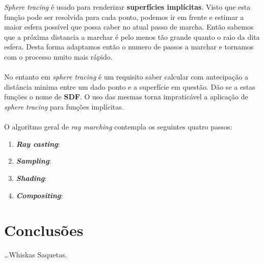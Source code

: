 \textit{Sphere tracing} é usado para renderizar \textbf{superfícies implícitas}.
Visto que esta função pode ser resolvida para cada ponto, podemos ir em frente e estimar a maior esfera possível que possa caber no atual passo de marcha. Então sabemos que a próxima distancia a marchar é pelo menos tão grande quanto o raio da dita esfera. Desta forma adaptamos então o numero de passos a marchar e tornamos com o processo muito mais rápido.\\

\\

No entanto em \textit{sphere tracing} é um requisito saber calcular com antecipação a distância minima entre um dado ponto e a superfície em questão. Dão se a estas funções o nome de \textbf{\ac{SDF}}.
O uso das mesmas torna impraticável a aplicação de \textit{sphere tracing} para funções implícitas. \\

\\

O algoritmo geral de \textit{ray marching} contempla os seguintes quatro passos:

\begin{enumerate}
	\item \textbf{\textit{Ray casting}}:
	
	\item \textbf{\textit{Sampling}}:
	
	\item \textbf{\textit{Shading}}:
	
	\item \textbf{\textit{Compositing}}:
\end{enumerate}


\section{\opengl}
\label{sec::arte:opengl}



\section{Conclusões}
\label{sec::arte:conc}

\ldots Whiskas Saquetas.
